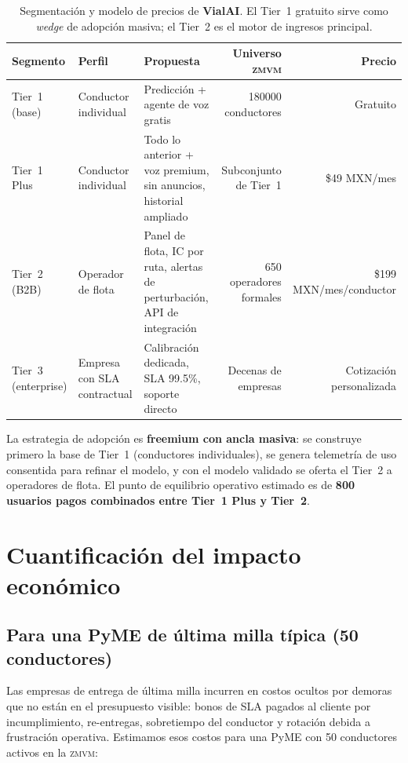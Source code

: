 \documentclass[11pt,a4paper]{article}
\newcommand{\VialAI}{\textbf{\textcolor{vialTeal}{Vial}\textcolor{vialAmber}{AI}}}
\newcommand{\ZMVM}{\textsc{zmvm}}
\begin{document}
\begin{table}[H]
\centering
\small
\renewcommand{\arraystretch}{1.5}
\begin{tabularx}{\linewidth}{@{}l l X r r@{}}
\toprule
\rowcolor{vialNavy!10}
\textbf{Segmento} & \textbf{Perfil} & \textbf{Propuesta} & \textbf{Universo \ZMVM} & \textbf{Precio} \\
\midrule
Tier~1 (base) & Conductor individual & Predicción + agente de voz gratis
  & \num{180000} conductores & Gratuito \\
Tier~1 Plus & Conductor individual & Todo lo anterior + voz premium,
  sin anuncios, historial ampliado
  & Subconjunto de Tier~1 & \$49 MXN/mes \\
Tier~2 (B2B) & Operador de flota & Panel de flota, IC por ruta,
  alertas de perturbación, API de integración
  & \num{650} operadores formales & \$199 MXN/mes/conductor \\
Tier~3 (enterprise) & Empresa con SLA contractual & Calibración
  dedicada, SLA 99.5\%, soporte directo
  & Decenas de empresas & Cotización personalizada \\
\bottomrule
\end{tabularx}
\caption{Segmentación y modelo de precios de \VialAI. El Tier~1 gratuito
         sirve como \emph{wedge} de adopción masiva; el Tier~2 es el motor
         de ingresos principal.}
\label{tab:tiers}
\end{table}

La estrategia de adopción es \textbf{freemium con ancla masiva}:
se construye primero la base de Tier~1 (conductores individuales),
se genera telemetría de uso consentida para refinar el modelo, y con
el modelo validado se oferta el Tier~2 a operadores de flota.
El punto de equilibrio operativo estimado es de
\textbf{\num{800} usuarios pagos combinados entre Tier~1 Plus y Tier~2}.

\section{Cuantificación del impacto económico}

\subsection{Para una PyME de última milla típica (50 conductores)}

Las empresas de entrega de última milla incurren en costos ocultos
por demoras que no están en el presupuesto visible: bonos de SLA
pagados al cliente por incumplimiento, re-entregas, sobretiempo del
conductor y rotación debida a frustración operativa. Estimamos esos
costos para una PyME con \num{50} conductores activos en la \ZMVM:
\end{document}
